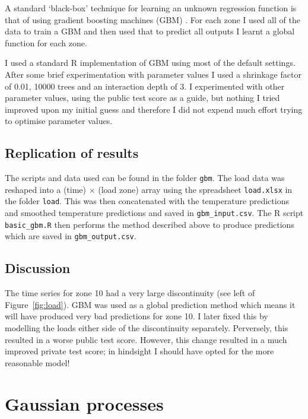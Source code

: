 \documentclass[preprint,authoryear,12pt]{elsarticle}
\begin{document}
A standard `black-box' technique for learning an unknown regression function is that of using gradient boosting machines (GBM) \citep[e.g. chapter 10 of][]{Hastie2009}.
For each zone I used all of the data to train a GBM and then used that to predict all outputs \ie I learnt a global function for each zone.

I used a standard R implementation of GBM using most of the default settings\footnotemark.
After some brief experimentation with parameter values I used a shrinkage factor of 0.01, 10000 trees and an interaction depth of 3.
I experimented with other parameter values, using the public test score as a guide, but nothing I tried improved upon my initial guess and therefore I did not expend much effort trying to optimise parameter values.


\subsection{Replication of results}

The scripts and data used can be found in the folder \texttt{gbm}.
The load data was reshaped into a (time) $\times$ (load zone) array using the spreadsheet \texttt{load.xlsx} in the folder \texttt{load}.
This was then concatenated with the temperature predictions and smoothed temperature predictions and saved in \texttt{gbm\_input.csv}.
The R script \texttt{basic\_gbm.R} then performs the method described above to produce predictions which are saved in \texttt{gbm\_output.csv}.

\subsection{Discussion}

The time series for zone 10 had a very large discontinuity (see left of Figure~\ref{fig:load}).
GBM was used as a global prediction method which means it will have produced very bad predictions for zone 10.
I later fixed this by modelling the loads either side of the discontinuity separately.
Perversely, this resulted in a worse public test score.
However, this change resulted in a much improved private test score; in hindsight I should have opted for the more reasonable model!

\section{Gaussian processes}
\end{document}
